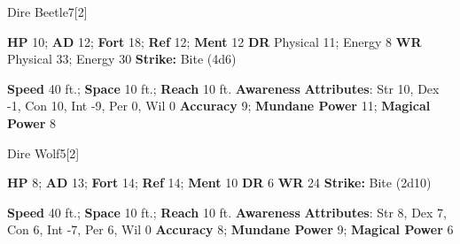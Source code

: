   
  \begin{monsection}{Dire Beetle}{7}[2]
    \vspace{-1em}\vspace{-1em}
    \begin{spellcontent}
      \begin{spelltargetinginfo}
        \pari \textbf{HP} 10;
          \textbf{AD} 12;
          \textbf{Fort} 18;
          \textbf{Ref} 12;
          \textbf{Ment} 12
        \pari \textbf{DR} Physical 11; Energy 8
        \pari \textbf{WR} Physical 33; Energy 30
        \pari \textbf{Strike:}
            Bite  (4d6)
      \end{spelltargetinginfo}
    \end{spellcontent}
    \begin{monsterfooter}
      \pari \textbf{Speed} 40 ft.;
        \textbf{Space} 10 ft.;
        \textbf{Reach} 10 ft.
      \pari \textbf{Awareness} 
      \pari \textbf{Attributes}:
        Str 10, Dex -1, Con 10,
        Int -9, Per 0, Wil 0
      \pari \textbf{Accuracy} 9;
        \textbf{Mundane Power} 11;
      \textbf{Magical Power} 8
    \end{monsterfooter}
  \end{monsection}
  
  
  \begin{monsection}{Dire Wolf}{5}[2]
    \vspace{-1em}\vspace{-1em}
    \begin{spellcontent}
      \begin{spelltargetinginfo}
        \pari \textbf{HP} 8;
          \textbf{AD} 13;
          \textbf{Fort} 14;
          \textbf{Ref} 14;
          \textbf{Ment} 10
        \pari \textbf{DR} 6
        \pari \textbf{WR} 24
        \pari \textbf{Strike:}
            Bite  (2d10)
      \end{spelltargetinginfo}
    \end{spellcontent}
    \begin{monsterfooter}
      \pari \textbf{Speed} 40 ft.;
        \textbf{Space} 10 ft.;
        \textbf{Reach} 10 ft.
      \pari \textbf{Awareness} 
      \pari \textbf{Attributes}:
        Str 8, Dex 7, Con 6,
        Int -7, Per 6, Wil 0
      \pari \textbf{Accuracy} 8;
        \textbf{Mundane Power} 9;
      \textbf{Magical Power} 6
    \end{monsterfooter}
  \end{monsection}
  
